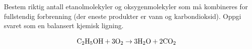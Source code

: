 

Bestem riktig antall etanolmolekyler og oksygenmolekyler som må kombineres for fullstendig forbrenning (der eneste produkter er vann og karbondioksid). Oppgi svaret som en balansert kjemisk ligning.







$$\hbox{C}_2 \hbox{H}_5 \hbox{OH} + 3 \hbox{O}_2 \to 3 \hbox{H}_2\hbox{O} + 2 \hbox{CO}_2$$










